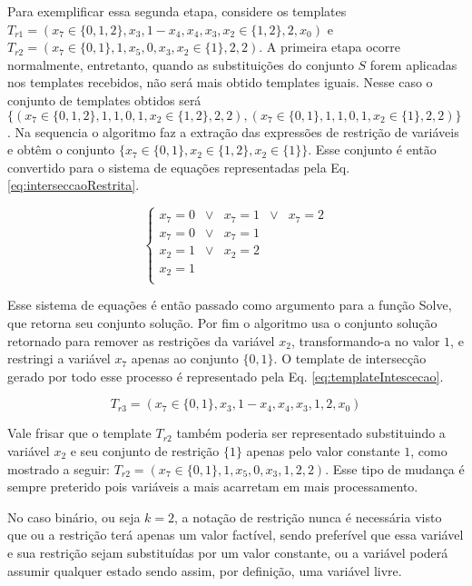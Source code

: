 Para exemplificar essa segunda etapa, considere os templates $T_{r1} = (x_7 \in \{0,1,2\},x_3,1-x_4,x_4,x_3,x_2 \in \{1,2\},2,x_0)$ e $T_{r2} = (x_7 \in \{0,1\},1,x_5,0,x_3,x_2 \in \{1\},2,2)$. A primeira etapa ocorre normalmente, entretanto, quando as substituições do conjunto $S$ forem aplicadas nos templates recebidos, não será mais obtido templates iguais. Nesse caso o conjunto de templates obtidos será $\{(x_7 \in \{0,1,2\}, 1, 1, 0, 1, x_2 \in \{1,2\}, 2, 2), (x_7 \in \{0,1\}, 1, 1, 0, 1, x_2 \in \{1\}, 2, 2)\}$. Na sequencia o algoritmo faz a extração das expressões de restrição de variáveis e obtêm o conjunto $\{x_7 \in \{0,1\}, x_2 \in \{1,2\}, x_2 \in \{1\} \}$. Esse conjunto é então convertido para o sistema de equações representadas pela Eq. \eqref{eq:interseccaoRestrita}.

\begin{equation}
\left\{\begin{matrix}
x_7	  = 0 	& \vee &	x_7	=	1 & \vee &	x_7	= 2	\\ 
x_7   = 0 	& \vee &	x_7	=	1					\\ 
x_2   = 1 	& \vee &	x_2	=	2					\\ 
x_2	  =	1											\\ 
\end{matrix}\right.
\label{eq:interseccaoRestrita}
\end{equation}

Esse sistema de equações é então passado como argumento para a função Solve, que retorna seu conjunto solução. Por fim o algoritmo usa o conjunto solução retornado para remover as restrições da variável $x_2$, transformando-a no valor $1$, e restringi a variável $x_7$ apenas ao conjunto $\{0,1\}$. O template de intersecção gerado por todo esse processo é representado pela Eq. \eqref{eq:templateIntescecao}.

\begin{equation}
T_{r3} = (x_7 \in \{0,1\}, x_3, 1-x_4, x_4, x_3, 1, 2, x_0)
\label{eq:templateIntescecao}
\end{equation}

Vale frisar que o template $T_{r2}$ também poderia ser representado substituindo a variável $x_2$ e seu conjunto de restrição $\{1\}$ apenas pelo valor constante $1$, como mostrado a seguir: $T_{r2} = (x_7 \in \{0,1\}, 1, x_5, 0, x_3, 1, 2, 2)$. Esse tipo de mudança é sempre preterido pois variáveis a mais acarretam em mais processamento.

No caso binário, ou seja $k = 2$, a notação de restrição nunca é necessária visto que ou a restrição terá apenas um valor factível, sendo preferível que essa variável e sua restrição sejam substituídas por um valor constante, ou a variável poderá assumir qualquer estado sendo assim, por definição, uma variável livre.